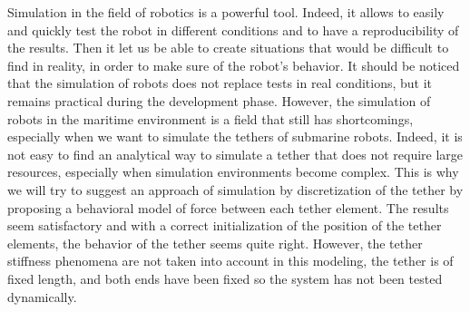 Simulation in the field of robotics is a powerful tool. Indeed, it allows to easily and quickly test the robot in different conditions and to have a reproducibility of the results. Then it let us be able to create situations that would be difficult to find in reality, in order to make sure of the robot's behavior. It should be noticed that the simulation of robots does not replace tests in real conditions, but it remains practical during the development phase. However, the simulation of robots in the maritime environment is a field that still has shortcomings, especially when we want to simulate the tethers of submarine robots. Indeed, it is not easy to find an analytical way to simulate a tether that does not require large resources, especially when simulation environments become complex. This is why we will try to suggest an approach of simulation by discretization of the tether by proposing a behavioral model of force between each tether element. The results seem satisfactory and with a correct initialization of the position of the tether elements, the behavior of the tether seems quite right. However, the tether stiffness phenomena are not taken into account in this modeling, the tether is of fixed length, and both ends have been fixed so the system has not been tested dynamically.